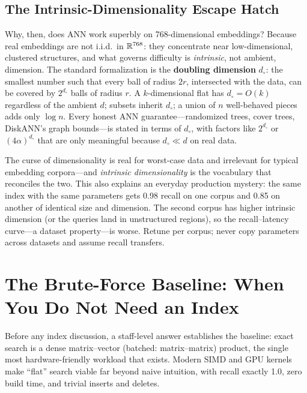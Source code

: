 \subsection{The Intrinsic-Dimensionality Escape Hatch}

Why, then, does ANN work superbly on 768-dimensional embeddings? Because real embeddings are not i.i.d.\ in $\mathbb{R}^{768}$: they concentrate near low-dimensional, clustered structures, and what governs difficulty is \emph{intrinsic}, not ambient, dimension. The standard formalization is the \textbf{doubling dimension} $d_\circ$: the smallest number such that every ball of radius $2r$, intersected with the data, can be covered by $2^{d_\circ}$ balls of radius $r$. A $k$-dimensional flat has $d_\circ = O(k)$ regardless of the ambient $d$; subsets inherit $d_\circ$; a union of $n$ well-behaved pieces adds only $\log n$. Every honest ANN guarantee---randomized trees, cover trees, DiskANN's graph bounds---is stated in terms of $d_\circ$, with factors like $2^{d_\circ}$ or $(4\alpha)^{d_\circ}$ that are only meaningful because $d_\circ \ll d$ on real data.

\begin{keyinsight}
The curse of dimensionality is real for worst-case data and irrelevant for typical embedding corpora---and \emph{intrinsic dimensionality} is the vocabulary that reconciles the two. This also explains an everyday production mystery: the same index with the same parameters gets 0.98 recall on one corpus and 0.85 on another of identical size and dimension. The second corpus has higher intrinsic dimension (or the queries land in unstructured regions), so the recall--latency curve---a dataset property---is worse. Retune per corpus; never copy parameters across datasets and assume recall transfers.
\end{keyinsight}

\section{The Brute-Force Baseline: When You Do Not Need an Index}
\label{sr:sec:vr_flat}

Before any index discussion, a staff-level answer establishes the baseline: exact search is a dense matrix--vector (batched: matrix--matrix) product, the single most hardware-friendly workload that exists. Modern SIMD and GPU kernels make ``flat'' search viable far beyond naive intuition, with recall exactly 1.0, zero build time, and trivial inserts and deletes.

